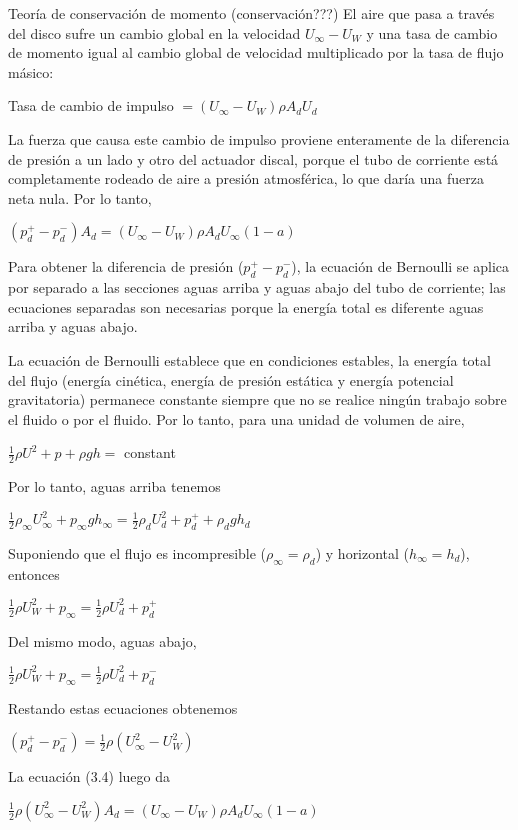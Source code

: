 Teoría de conservación de momento (conservación???)
El aire que pasa a través del disco sufre un cambio global en la velocidad $U_{\infty} - U_W$ y una tasa de cambio de momento igual al cambio global de velocidad multiplicado por la tasa de flujo másico:

Tasa de cambio de impulso  $= (U_{\infty} - U_W) \rho A_d U_d$

La fuerza que causa este cambio de impulso proviene enteramente de la diferencia de presión a un lado y otro del actuador discal, porque el tubo de corriente está completamente rodeado de aire a presión atmosférica, lo que daría una fuerza neta nula. Por lo tanto,

$(p_{d}^{+} - p_{d}^{-}) A_d = (U_{\infty} - U_W) \rho A_d U_{\infty} (1-a)$

Para obtener la diferencia de presión ($p_{d}^{+} - p_{d}^{-}$), la ecuación de Bernoulli se aplica por separado a las secciones aguas arriba y aguas abajo del tubo de corriente; las ecuaciones separadas son necesarias porque la energía total es diferente aguas arriba y aguas abajo.

La ecuación de Bernoulli establece que en condiciones estables, la energía total del flujo (energía cinética, energía de presión estática y energía potencial gravitatoria) permanece constante siempre que no se realice ningún trabajo sobre el fluido o por el fluido. Por lo tanto, para una unidad de volumen de aire,

$\frac{1}{2}\rho U^2 + p + \rho g h =$ constant

Por lo tanto, aguas arriba tenemos

$\frac{1}{2}\rho_{\infty} U_{\infty}^{2} + p_{\infty} g h_{\infty} = \frac{1}{2} \rho_{d} U_{d}^{2} + p_{d}^{+} + \rho_{d} g h_{d}$

Suponiendo que el flujo es incompresible ($\rho_{\infty} = \rho_{d}$) y horizontal ($h_{\infty} = h_{d}$), entonces

$\frac{1}{2}\rho U_{W}^2 + p_{\infty} = \frac{1}{2} \rho U_{d}^{2} + p_{d}^{+}$

Del mismo modo, aguas abajo,

$\frac{1}{2}\rho U_{W}^2 + p_{\infty} = \frac{1}{2} \rho U_{d}^{2} + p_{d}^{-}$

Restando estas ecuaciones obtenemos

$(p_{d}^{+} - p_{d}^{-}) = \frac{1}{2}\rho (U_{\infty}^{2} - U_{W}^{2})$

La ecuación (3.4) luego da

$\frac{1}{2}\rho(U_{\infty}^2 - U_{W}^{2}) A_d = (U_{\infty} - U_{W}) \rho A_{d} U_{\infty}(1-a)$

